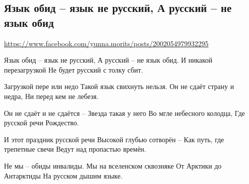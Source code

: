  
 
 
 
 

\subsection{Язык обид – язык не русский, А русский – не язык обид}
\label{sec:08_04_2021.fb.morits_junna.1.jazyk}
\url{https://www.facebook.com/yunna.morits/posts/2002054979932295}

Язык обид – язык не русский,
А русский – не язык обид.
И никакой перезагрузкой
Не будет русский с толку сбит.

Загрузкой пере или недо
Такой язык свихнуть нельзя.
Он не сдаёт страну и недра,
Ни перед кем не лебезя.

Он не сдаёт и не сдаётся –
Звезда такая у него
Во мгле небесного колодца,
Где русской речи Рождество.

И этот праздник русской речи
Высокой глубью сотворён –
Как путь, где трепетные свечи
Ведут над пропастью времён.

Не мы – обиды инвалиды.
Мы на вселенском сквозняке
От Арктики до Антарктиды
На русском дышим языке.
